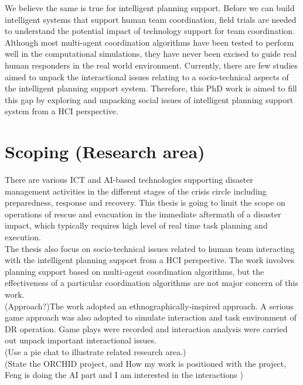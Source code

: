 We believe the same is true for intelligent planning support. Before we can build intelligent systems that support human team coordination, field trials are needed to understand the potential impact of technology support for team coordination. Although most multi-agent coordination algorithms have been tested to perform well in the computational simulations, they have never been excised to guide real human responders in the real world environment. Currently, there are few studies aimed to unpack the interactional issues relating to a socio-technical aspects of the intelligent planning support system. Therefore, this PhD work is aimed to fill this gap by exploring and unpacking social issues of intelligent planning support system from a HCI perspective.\\

\section{Scoping (Research area)}\label{sec:custom}

There are various ICT and AI-based technologies supporting disaster management activities in the different stages of the crisis circle including preparedness, response and recovery. This thesis is going to limit the scope on operations of rescue and evacuation in the immediate aftermath of a disaster impact, which typically requires high level of real time task planning and execution.\\ 

The thesis also focus on socio-technical issues related to human team interacting with the intelligent planning support from a HCI perspective. The work involves planning support based on multi-agent coordination algorithms, but the effectiveness of a particular coordination algorithms are not major concern of this work.\\

(Approach?)The work adopted an ethnographically-inspired approach. A serious game approach was also adopted to simulate interaction and task environment of DR operation. Game plays were recorded and interaction analysis were carried out unpack important interactional issues. \\

(Use a pie chat to illustrate related research area.) \\

(State the ORCHID project, and How my work is positioned with the project, Feng is doing the AI part and I am interested in the interactions )



